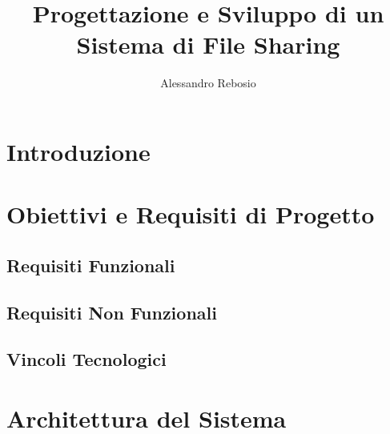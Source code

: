 \documentclass[12pt,a4paper]{report}
\begin{document}
\title{Progettazione e Sviluppo di un Sistema di File Sharing}
\author{Alessandro Rebosio}

\maketitle


\chapter*{Introduzione}
\label{chap:introduzione}

\tableofcontents

\cleardoublepage
{}
\setcounter{page}{1}

\chapter{Obiettivi e Requisiti di Progetto}
\label{cap:obiettivi}

\section{Requisiti Funzionali}

\section{Requisiti Non Funzionali}

\section{Vincoli Tecnologici}

\chapter{Architettura del Sistema}
\label{cap:architettura}
\end{document}
